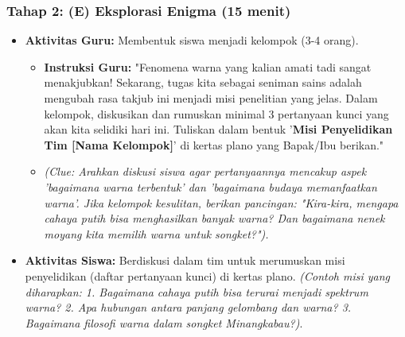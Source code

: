 \documentclass[12pt,a4paper]{article}
\begin{document}
\subsubsection{Tahap 2: (E) Eksplorasi Enigma (15 menit)}
\begin{itemize}
\item \textbf{Aktivitas Guru:} Membentuk siswa menjadi kelompok (3-4 orang).
    \begin{itemize}
    \item \textbf{Instruksi Guru:} "Fenomena warna yang kalian amati tadi sangat menakjubkan! Sekarang, tugas kita sebagai seniman sains adalah mengubah rasa takjub ini menjadi misi penelitian yang jelas. Dalam kelompok, diskusikan dan rumuskan minimal 3 pertanyaan kunci yang akan kita selidiki hari ini. Tuliskan dalam bentuk '\textbf{Misi Penyelidikan Tim [Nama Kelompok]}' di kertas plano yang Bapak/Ibu berikan."
    \item \textit{(Clue: Arahkan diskusi siswa agar pertanyaannya mencakup aspek 'bagaimana warna terbentuk' dan 'bagaimana budaya memanfaatkan warna'. Jika kelompok kesulitan, berikan pancingan: "Kira-kira, mengapa cahaya putih bisa menghasilkan banyak warna? Dan bagaimana nenek moyang kita memilih warna untuk songket?").}
    \end{itemize}
\item \textbf{Aktivitas Siswa:} Berdiskusi dalam tim untuk merumuskan misi penyelidikan (daftar pertanyaan kunci) di kertas plano. \textit{(Contoh misi yang diharapkan: 1. Bagaimana cahaya putih bisa terurai menjadi spektrum warna? 2. Apa hubungan antara panjang gelombang dan warna? 3. Bagaimana filosofi warna dalam songket Minangkabau?)}.
\end{itemize}
\end{document}
